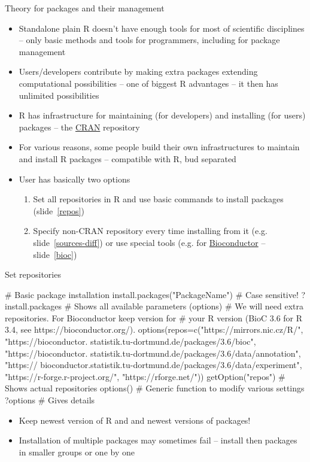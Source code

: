 \documentclass[compress, ucs, xelatex, 11pt, xcolor=svgnames,
  hyperref={
    bookmarks=true,
    unicode=true,
    colorlinks=true,
    pdftitle={Molecular data in R},
    plainpages=false,
    pdfauthor={Vojtech Zeisek},
    pdfsubject={Course about phylogeny and evolution in R},
    pdfcreator={XeLaTeX},
    pdfkeywords={R, evolution, phylogeny, molecular data},
    linkcolor=Tomato,
    anchorcolor=SaddleBrown,
    citecolor=Goldenrod,
    filecolor=DarkMagenta,
    menucolor=Sienna,
    urlcolor=DarkTurquoise,
    pdftex},
  url={hyphens, lowtilde} %
  ]{beamer}
\begin{document}
\begin{frame}{Theory for packages and their management}
  \begin{itemize}
    \item Standalone plain R doesn't have enough tools for most of scientific disciplines -- only basic methods and tools for programmers, including for package management
    \item Users/developers contribute by making extra packages extending computational possibilities -- one of biggest R advantages -- it then has unlimited possibilities
    \item R has infrastructure for maintaining (for developers) and installing (for users) packages -- the \href{https://cran.r-project.org/}{CRAN} repository
    \item For various reasons, some people build their own infrastructures to maintain and install R packages -- compatible with R, bud separated
    \item User has basically two options
    \begin{enumerate}
      \item Set all repositories in R and use basic commands to install packages (slide~\ref{repos})
      \item Specify non-CRAN repository every time installing from it (e.g. slide~\ref{sources-diff}) or use special tools (e.g. for \href{http://bioconductor.org/install/}{Bioconductor} -- slide~\ref{bioc})
    \end{enumerate}
  \end{itemize}
\end{frame}

\begin{frame}[fragile]{Set repositories}
  \label{repos}
  \begin{spluscode}
    # Basic package installation
    install.packages("PackageName") # Case sensitive!
    ?install.packages # Shows all available parameters (options)
    # We will need extra repositories. For Bioconductor keep version for
    # your R version (BioC 3.6 for R 3.4, see https://bioconductor.org/).
    options(repos=c("https://mirrors.nic.cz/R/", "https://bioconductor.
      statistik.tu-dortmund.de/packages/3.6/bioc", "https://bioconductor.
      statistik.tu-dortmund.de/packages/3.6/data/annotation", "https://
      bioconductor.statistik.tu-dortmund.de/packages/3.6/data/experiment", 
      "https://r-forge.r-project.org/", "https://rforge.net/"))
    getOption("repos") # Shows actual repositories
    options() # Generic function to modify various settings
    ?options # Gives details
  \end{spluscode}
  \begin{itemize}
    \item \alert{Keep newest version of R and and newest versions of packages!}
    \item Installation of multiple packages may sometimes fail -- install then packages in smaller groups or one by one
  \end{itemize}
\end{frame}
\end{document}
